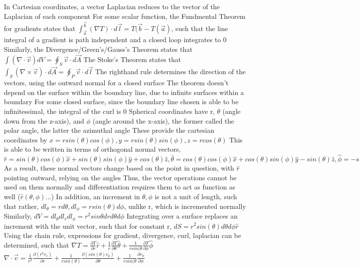 \documentclass[11 pt, twoside]{article}
\newenvironment{outline*}
{
	\begin{outline}[enumerate]
	}
	{\end{outline}
}
\begin{document}
\begin{outline*}
			\4 In Cartesian coordinates, a vector Laplacian reduces to the vector of the Laplacian of each component
\1 For some scalar function, the Fundmental Theorem for gradients states that $\int^{\vec{b}}_{\vec{a}} (\nabla T) \cdot d\vec{l} = T(\vec{b} - T(\vec{a})$, such that the line integral of a gradient is path independent and a closed loop integrates to 0
	\2 Similarly, the Divergence/Green's/Gauss's Theorem states that $\int(\nabla \cdot \vec{v}) dV = \oint_{S} \vec{v} \cdot d\vec{A}$
	\2 The Stoke's Theorem states that $\int_S (\nabla \times \vec{v}) \cdot d\vec{A} = \oint_P \vec{v} \cdot d\vec{l}$
		\3 The righthand rule determines the direction of the vectors, using the outward normal for a closed surface
		\3 The theorem doesn't depend on the surface within the boundary line, due to infinite surfaces within a boundary
		\3 For some closed surface, since the boundary line chosen is able to be infinitessimal, the integral of the curl is 0
\1 Spherical coordinates have r, $\theta$ (angle down from the z-axis), and $\phi$ (angle around the x-axis), the former called the polar angle, the latter the azimuthal angle
	\2 These provide the cartesian coordinates by $x = rsin(\theta)cos(\phi), y = rsin(\theta)sin(\phi), z = rcos(\theta)$
	\2 This is able to be written in terms of orthogonal normal vectors, $\hat{r} = sin(\theta)cos(\phi)\hat{x} + sin(\theta)sin(\phi)\hat{y} + cos(\theta)\hat{z}, \hat{\theta} = cos(\theta)cos(\phi)\hat{x} + cos(\theta)sin(\phi)\hat{y} - sin(\theta)\hat{z}, \hat{\phi} = -sin(\phi)\hat{x} + cos(\phi)\hat{y}$
		\3 As a result, these normal vectors change based on the point in question, with $\hat{r}$ pointing outward, relying on the angles
		\3 Thus, the vector operations cannot be used on them normally and differentiation requires them to act as function as well ($\hat{r}(\theta, \phi)...$)
		\3 In addition, an increment in $\theta, \phi$ is not a unit of length, such that rather, $dl_{\theta} = rd\theta, dl_{\phi} = rsin(\theta)d\phi$, unlike r, which is incremented normally
			\4 Similarly, $dV = dl_{\theta}dl_rdl_{\phi} = r^2sin\theta drd\theta d\phi$
			\4 Integrating over a surface replaces an increment with the unit vector, such that for constant r, $dS = r^2sin(\theta)d\theta d\phi \hat{r}$
	\2 Using the chain rule, expressions for gradient, divergence, curl, laplacian can be determined, such that $\nabla T = \frac{\partial T}{\partial r}\hat{r} + \frac{1}{r}\frac{\partial T}{\partial \theta}\hat{\theta} + \frac{1}{rsin(\theta}\frac{\partial T}{\partial \phi}\hat{\phi}$
		\3 $\nabla \cdot \vec{v} = \frac{1}{r^2}\frac{\partial(r^2v_r)}{\partial r} + \frac{1}{rsin(\theta)}\frac{\partial(sin(\theta)v_{\theta})}{\partial \theta} + \frac{1}{rsin(\theta}\frac{\partial v_{\phi}}{\partial \phi}$

\end{outline*}
\end{document}

